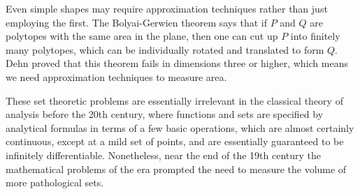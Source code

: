 \begin{remark}
Even simple shapes may require approximation techniques rather than just employing the first. The Bolyai-Gerwien theorem says that if $P$ and $Q$ are polytopes with the same area in the plane, then one can cut up $P$ into finitely many polytopes, which can be individually rotated and translated to form $Q$. Dehn proved that this theorem fails in dimensions three or higher, which means we need approximation techniques to measure area.
\end{remark}

These set theoretic problems are essentially irrelevant in the classical theory of analysis before the 20th century, where functions and sets are specified by analytical formulas in terms of a few basic operations, which are almost certainly continuous, except at a mild set of points, and are essentially guaranteed to be infinitely differentiable. Nonetheless, near the end of the 19th century the mathematical problems of the era prompted the need to measure the volume of more pathological sets.
%
